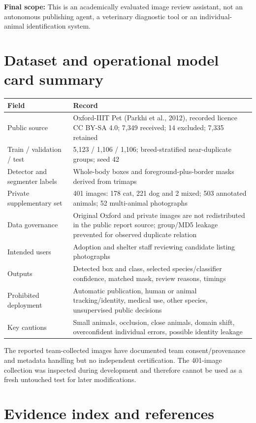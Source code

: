 \documentclass[11pt,a4paper]{article}
\begin{document}
\textbf{Final scope:} This is an academically evaluated image review assistant, not an autonomous publishing agent, a veterinary diagnostic tool or an individual-animal identification system.
\clearpage

\appendix
\section{Dataset and operational model card summary}

{\small\begin{tabularx}{\linewidth}{@{}P{4.1cm} Y@{}}\toprule
Field & Record\\\midrule
Public source & Oxford-IIIT Pet (Parkhi et al., 2012), recorded licence CC BY-SA 4.0; 7,349 received; 14 excluded; 7,335 retained\\
Train / validation / test & 5,123 / 1,106 / 1,106; breed-stratified near-duplicate groups; seed 42\\
Detector and segmenter labels & Whole-body boxes and foreground-plus-border masks derived from trimaps\\
Private supplementary set & 401 images: 178 cat, 221 dog and 2 mixed; 503 annotated animals; 52 multi-animal photographs\\
Data governance & Original Oxford and private images are not redistributed in the public report source; group/MD5 leakage prevented for observed duplicate relation\\
Intended users & Adoption and shelter staff reviewing candidate listing photographs\\
Outputs & Detected box and class, selected species/classifier confidence, matched mask, review reasons, timings\\
Prohibited deployment & Automatic publication, human or animal tracking/identity, medical use, other species, unsupervised public decisions\\
Key cautions & Small animals, occlusion, close animals, domain shift, overconfident individual errors, possible identity leakage\\\bottomrule\end{tabularx}}
The reported team-collected images have documented team consent/provenance and metadata handling but no independent certification. The 401-image collection was inspected during development and therefore cannot be used as a fresh untouched test for later modifications.
\section{Evidence index and references}
\end{document}
